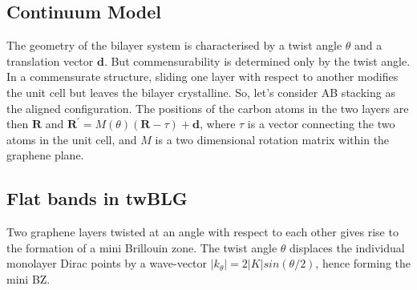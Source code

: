 \subsection{Continuum Model}
The geometry of the bilayer system is characterised by a twist angle $\theta$ and a translation vector $\boldsymbol{d}$. But commensurability is determined only by the twist angle. In a commensurate structure, sliding one layer with respect to another modifies the unit cell but leaves the bilayer crystalline. So, let's consider AB stacking as the aligned configuration. The positions of the carbon atoms in the two layers are then $\boldsymbol{R}$ and $\boldsymbol{R^{\prime}} = M(\theta)(\boldsymbol{R}-\tau)+\boldsymbol{d}$, where $\tau$ is a vector connecting the two atoms in the unit cell, and $M$ is a two dimensional rotation matrix within the graphene plane.

\subsection{Flat bands in twBLG}
Two graphene layers twisted at an angle with respect to each other gives rise to the formation of a mini Brillouin zone. The twist angle $\theta$ displaces the individual monolayer Dirac points by a wave-vector $|k_\theta|=2|K|sin(\theta/2)$, hence forming the mini BZ.

